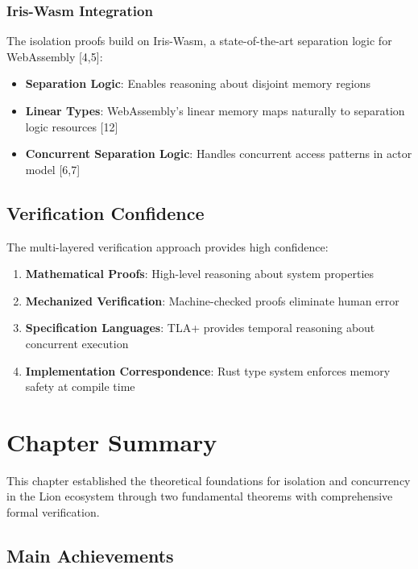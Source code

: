\subsubsection{Iris-Wasm Integration}

The isolation proofs build on Iris-Wasm, a state-of-the-art separation logic for WebAssembly [4,5]:

\begin{itemize}
\item \textbf{Separation Logic}: Enables reasoning about disjoint memory regions
\item \textbf{Linear Types}: WebAssembly's linear memory maps naturally to separation logic resources [12]
\item \textbf{Concurrent Separation Logic}: Handles concurrent access patterns in actor model [6,7]
\end{itemize}

\subsection{Verification Confidence}

The multi-layered verification approach provides high confidence:

\begin{enumerate}
\item \textbf{Mathematical Proofs}: High-level reasoning about system properties
\item \textbf{Mechanized Verification}: Machine-checked proofs eliminate human error
\item \textbf{Specification Languages}: TLA+ provides temporal reasoning about concurrent execution
\item \textbf{Implementation Correspondence}: Rust type system enforces memory safety at compile time
\end{enumerate}

\newpage

\section{Chapter Summary}

This chapter established the theoretical foundations for isolation and concurrency in the Lion ecosystem through two fundamental theorems with comprehensive formal verification.

\subsection{Main Achievements}

